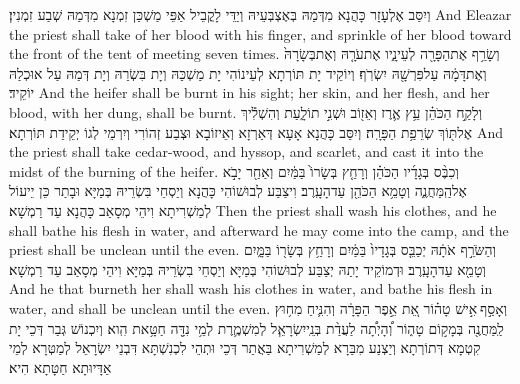 {וְיִסַּב אֶלְעָזָר כָּהֲנָא מִדְּמַהּ בְּאֶצְבְּעֵיהּ וְיַדֵּי לָקֳבֵיל אַפֵּי מַשְׁכַּן זִמְנָא מִדְּמַהּ שְׁבַע זִמְנִין׃}
{And Eleazar the priest shall take of her blood with his finger, and sprinkle of her blood toward the front of the tent of meeting seven times.}{}
{וְשָׂרַ֥ף אֶת\maqqaf הַפָּרָ֖ה לְעֵינָ֑יו אֶת\maqqaf עֹרָ֤הּ וְאֶת\maqqaf בְּשָׂרָהּ֙ וְאֶת\maqqaf דָּמָ֔הּ עַל\maqqaf פִּרְשָׁ֖הּ יִשְׂרֹֽף׃}
{וְיוֹקֵיד יָת תּוֹרְתָא לְעֵינוֹהִי יָת מַשְׁכַּהּ וְיָת בִּשְׂרַהּ וְיָת דְּמַהּ עַל אוּכְלַהּ יוֹקֵיד׃}
{And the heifer shall be burnt in his sight; her skin, and her flesh, and her blood, with her dung, shall be burnt.}{}
{וְלָקַ֣ח הַכֹּהֵ֗ן עֵ֥ץ אֶ֛רֶז וְאֵז֖וֹב וּשְׁנִ֣י תוֹלָ֑עַת וְהִשְׁלִ֕יךְ אֶל\maqqaf תּ֖וֹךְ שְׂרֵפַ֥ת הַפָּרָֽה׃}
{וְיִסַּב כָּהֲנָא אָעָא דְּאַרְזָא וְאֵיזוֹבָא וּצְבַע זְהוֹרִי וְיִרְמֵי לְגוֹ יְקֵידַת תּוֹרְתָא׃}
{And the priest shall take cedar-wood, and hyssop, and scarlet, and cast it into the midst of the burning of the heifer.}{}
{וְכִבֶּ֨ס בְּגָדָ֜יו הַכֹּהֵ֗ן וְרָחַ֤ץ בְּשָׂרוֹ֙ בַּמַּ֔יִם וְאַחַ֖ר יָבֹ֣א אֶל\maqqaf הַֽמַּחֲנֶ֑ה וְטָמֵ֥א הַכֹּהֵ֖ן עַד\maqqaf הָעָֽרֶב׃}
{וִיצַבַּע לְבוּשׁוֹהִי כָּהֲנָא וְיַסְחֵי בִּשְׂרֵיהּ בְּמַיָּא וּבָתַר כֵּן יֵיעוֹל לְמַשְׁרִיתָא וִיהֵי מְסָאַב כָּהֲנָא עַד רַמְשָׁא׃}
{Then the priest shall wash his clothes, and he shall bathe his flesh in water, and afterward he may come into the camp, and the priest shall be unclean until the even.}{}
{וְהַשֹּׂרֵ֣ף אֹתָ֔הּ יְכַבֵּ֤ס בְּגָדָיו֙ בַּמַּ֔יִם וְרָחַ֥ץ בְּשָׂר֖וֹ בַּמָּ֑יִם וְטָמֵ֖א עַד\maqqaf הָעָֽרֶב׃}
{וּדְמוֹקֵיד יָתַהּ יְצַבַּע לְבוּשׁוֹהִי בְּמַיָּא וְיַסְחֵי בִשְׂרֵיהּ בְּמַיָּא וִיהֵי מְסָאַב עַד רַמְשָׁא׃}
{And he that burneth her shall wash his clothes in water, and bathe his flesh in water, and shall be unclean until the even.}{}
{וְאָסַ֣ף \legarmeh  אִ֣ישׁ טָה֗וֹר אֵ֚ת אֵ֣פֶר הַפָּרָ֔ה וְהִנִּ֛יחַ מִח֥וּץ לַֽמַּחֲנֶ֖ה בְּמָק֣וֹם טָה֑וֹר וְ֠הָיְתָ֠ה לַעֲדַ֨ת בְּנֵֽי\maqqaf יִשְׂרָאֵ֧ל לְמִשְׁמֶ֛רֶת לְמֵ֥י נִדָּ֖ה חַטָּ֥את הִֽוא׃}
{וְיִכְנוֹשׁ גְּבַר דְּכֵי יָת קִטְמָא דְּתוֹרְתָא וְיַצְנַע מִבַּרָא לְמַשְׁרִיתָא בַּאֲתַר דְּכֵי וּתְהֵי לִכְנִשְׁתָּא דִּבְנֵי יִשְׂרָאֵל לְמַטְּרָא לְמֵי אַדָּיוּתָא חַטָּתָא הִיא׃}
